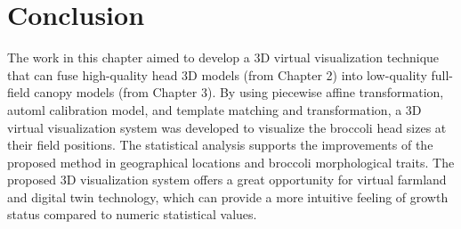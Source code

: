 \section{Conclusion}

The work in this chapter aimed to develop a 3D virtual visualization technique that can fuse high-quality head 3D models (from Chapter 2) into low-quality full-field canopy models (from Chapter 3). By using piecewise affine transformation, \gls{automl} calibration model, and template matching and transformation, a 3D virtual visualization system was developed to visualize the broccoli head sizes at their field positions. The statistical analysis supports the improvements of the proposed method in geographical locations and broccoli morphological traits. The proposed 3D visualization system offers a great opportunity for virtual farmland and digital twin technology, which can provide a more intuitive feeling of growth status compared to numeric statistical values.